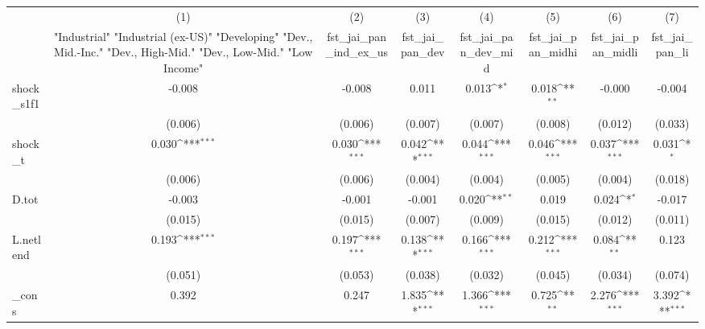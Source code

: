 {
\def\sym#1{\ifmmode^{#1}\else\(^{#1}\)\fi}
\begin{tabular}{l*{7}{c}}
\toprule
            &\multicolumn{1}{c}{(1)}&\multicolumn{1}{c}{(2)}&\multicolumn{1}{c}{(3)}&\multicolumn{1}{c}{(4)}&\multicolumn{1}{c}{(5)}&\multicolumn{1}{c}{(6)}&\multicolumn{1}{c}{(7)}\\
            &\multicolumn{1}{c}{ "Industrial" "Industrial (ex-US)" "Developing" "Dev., Mid.-Inc." "Dev., High-Mid."  "Dev., Low-Mid." "Low Income" }&\multicolumn{1}{c}{fst\_jai\_pan\_ind\_ex\_us}&\multicolumn{1}{c}{fst\_jai\_pan\_dev}&\multicolumn{1}{c}{fst\_jai\_pan\_dev\_mid}&\multicolumn{1}{c}{fst\_jai\_pan\_midhi}&\multicolumn{1}{c}{fst\_jai\_pan\_midli}&\multicolumn{1}{c}{fst\_jai\_pan\_li}\\
\midrule
shock\_s1f1  &      -0.008         &      -0.008         &       0.011         &       0.013\sym{*}  &       0.018\sym{**} &      -0.000         &      -0.004         \\
            &     (0.006)         &     (0.006)         &     (0.007)         &     (0.007)         &     (0.008)         &     (0.012)         &     (0.033)         \\
\addlinespace
shock\_t     &       0.030\sym{***}&       0.030\sym{***}&       0.042\sym{***}&       0.044\sym{***}&       0.046\sym{***}&       0.037\sym{***}&       0.031\sym{*}  \\
            &     (0.006)         &     (0.006)         &     (0.004)         &     (0.004)         &     (0.005)         &     (0.004)         &     (0.018)         \\
\addlinespace
D.tot       &      -0.003         &      -0.001         &      -0.001         &       0.020\sym{**} &       0.019         &       0.024\sym{*}  &      -0.017         \\
            &     (0.015)         &     (0.015)         &     (0.007)         &     (0.009)         &     (0.015)         &     (0.012)         &     (0.011)         \\
\addlinespace
L.netlend   &       0.193\sym{***}&       0.197\sym{***}&       0.138\sym{***}&       0.166\sym{***}&       0.212\sym{***}&       0.084\sym{**} &       0.123         \\
            &     (0.051)         &     (0.053)         &     (0.038)         &     (0.032)         &     (0.045)         &     (0.034)         &     (0.074)         \\
\addlinespace
\_cons      &       0.392         &       0.247         &       1.835\sym{***}&       1.366\sym{***}&       0.725\sym{**} &       2.276\sym{***}&       3.392\sym{***}\\

\end{tabular}}
